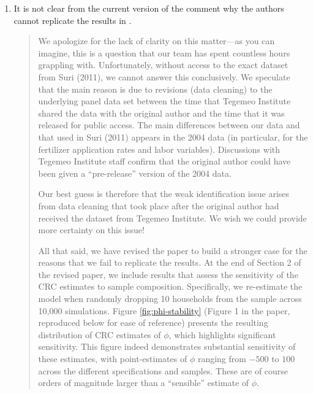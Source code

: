 \documentclass{article}[11pt]
\begin{document}
\begin{enumerate}
\begin{itemize}
\begin{quote}
      \end{quote}
  \end{itemize}
  \item It is not clear from the current version of the comment why the authors cannot replicate the results in \citet{S2011}.
  \begin{quote}
    We apologize for the lack of clarity on this matter---as you can imagine, this is a question that our team has spent countless hours grappling with. 
    Unfortunately, without access to the exact dataset from Suri (2011), we cannot answer this conclusively.
    We speculate that the main reason is due to revisions (data cleaning) to the underlying panel data set between the time that Tegemeo Institute shared the data with the original author and the time that it was released for public access.
    The main differences between our data and that used in Suri (2011) appears in the 2004 data (in particular, for the fertilizer application rates and labor variables). 
    Discussions with Tegemeo Institute staff confirm that the original author could have been given a ``pre-release'' version of the 2004 data.\newline

    Our best guess is therefore that the weak identification issue arises from data cleaning that took place after the original author had received the dataset from Tegemeo Institute.
    We wish we could provide more certainty on this issue! \newline

    All that said, we have revised the paper to build a stronger case for the reasons that we fail to replicate the \citet{S2011} results. 
    At the end of Section 2 of the revised paper, we include results that assess the sensitivity of the CRC estimates to sample composition. 
    Specifically, we re-estimate the model when randomly dropping 10 households from the sample across 10,000 simulations. 
    Figure \ref{fig:phi-stability} (Figure 1 in the paper, reproduced below for ease of reference) presents the resulting distribution of CRC estimates of $\phi$, which highlights significant sensitivity. 
    This figure indeed demonstrates substantial sensitivity of these estimates, with point-estimates of $\phi$ ranging from $-500$ to $100$ across the different specifications and samples. 
    These are of course orders of magnitude larger than a ``sensible'' estimate of $\phi$. 
  \end{quote}


\end{enumerate}
\end{document}
